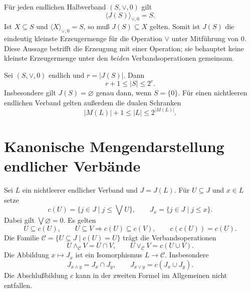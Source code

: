 \begin{theorem}
\label{b45guide:thm:minimal-generators}
Für jeden endlichen Halbverband $(S,\vee,0)$ gilt
\[
 \langle J(S)\rangle_{\vee,0}=S.
\]
Ist $X\subseteq S$ und $\langle X\rangle_{\vee,0}=S$,
so muß $J(S)\subseteq X$ gelten.
Somit ist $J(S)$ die eindeutig kleinste Erzeugermenge
für die Operation $\vee$ unter Mitführung von $0$.
Diese Aussage betrifft die Erzeugung mit einer Operation;
sie behauptet keine kleinste Erzeugermenge unter den
\emph{beiden} Verbandsoperationen gemeinsam.
\end{theorem}

\begin{theorem}
\label{b45guide:thm:cardinality}
Sei $(S,\vee,0)$ endlich und $r=|J(S)|$. Dann
\[
 r+1\leq |S|\leq2^r.
\]
Insbesondere gilt $J(S)=\varnothing$ genau dann, wenn $S=\{0\}$.
Für einen nichtleeren endlichen Verband gelten außerdem die
dualen Schranken
\[
 |M(L)|+1\leq|L|\leq2^{|M(L)|}.
\]
\end{theorem}

\section{Kanonische Mengendarstellung endlicher Verbände}

\begin{theorem}
\label{b45guide:thm:closure-representation}
Sei $L$ ein nichtleerer endlicher Verband und $J=J(L)$. Für
$U\subseteq J$ und $x\in L$ setze
\[
 c(U)=\{j\in J\mid j\leq\bigvee U\},\qquad
 J_x=\{j\in J\mid j\leq x\}.
\]
Dabei gilt $\bigvee\varnothing=0$. Es gelten
\[
 U\subseteq c(U),\qquad
 U\subseteq V\Rightarrow c(U)\subseteq c(V),\qquad
 c(c(U))=c(U).
\]
Die Familie $\mathcal C=\{U\subseteq J\mid c(U)=U\}$ trägt
die Verbandsoperationen
\[
 U\wedge_{\mathcal C}V=U\cap V,\qquad
 U\vee_{\mathcal C}V=c(U\cup V).
\]
Die Abbildung $x\mapsto J_x$ ist ein Isomorphismus $L\to\mathcal C$.
Insbesondere
\[
 J_{x\wedge y}=J_x\cap J_y,\qquad
 J_{x\vee y}=c(J_x\cup J_y).
\]
Die Abschlußbildung $c$ kann in der zweiten Formel im Allgemeinen
nicht entfallen. \cite{nation}
\end{theorem}
